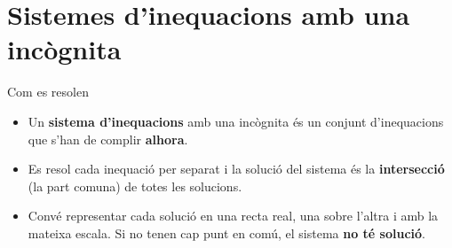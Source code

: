 \documentclass[11pt,a4paper]{article}
\begin{document}
\Needspace{5.7cm}
\section{Sistemes d'inequacions amb una incògnita}\hypertarget{sec6}{}
\begin{fmprop}{Com es resolen}
\begin{itemize}
\item Un \textbf{sistema d'inequacions} amb una incògnita és un conjunt d'inequacions que s'han de complir \textbf{alhora}.
\item Es resol cada inequació per separat i la solució del sistema és la \textbf{intersecció} (la part comuna) de totes les solucions.
\item Convé representar cada solució en una recta real, una sobre l'altra i amb la mateixa escala. Si no tenen cap punt en comú, el sistema \textbf{no té solució}.
\end{itemize}
\end{fmprop}
\end{document}
